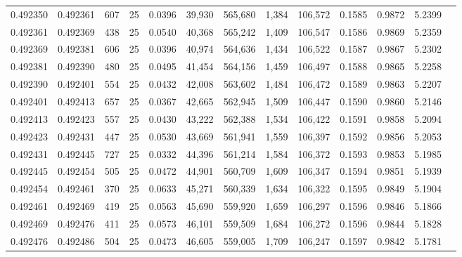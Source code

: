 \begin{tabular}{rrrrrrrrrrrrr}
0.492350 & 0.492361 &   607 &  25 &                                     0.0396 &  39,930 & 565,680 &   1,384 & 106,572 & 0.1585 & 0.9872 & 5.2399 \\
0.492361 & 0.492369 &   438 &  25 &                                     0.0540 &  40,368 & 565,242 &   1,409 & 106,547 & 0.1586 & 0.9869 & 5.2359 \\
0.492369 & 0.492381 &   606 &  25 &                                     0.0396 &  40,974 & 564,636 &   1,434 & 106,522 & 0.1587 & 0.9867 & 5.2302 \\
0.492381 & 0.492390 &   480 &  25 &                                     0.0495 &  41,454 & 564,156 &   1,459 & 106,497 & 0.1588 & 0.9865 & 5.2258 \\
0.492390 & 0.492401 &   554 &  25 &                                     0.0432 &  42,008 & 563,602 &   1,484 & 106,472 & 0.1589 & 0.9863 & 5.2207 \\
0.492401 & 0.492413 &   657 &  25 &                                     0.0367 &  42,665 & 562,945 &   1,509 & 106,447 & 0.1590 & 0.9860 & 5.2146 \\
0.492413 & 0.492423 &   557 &  25 &                                     0.0430 &  43,222 & 562,388 &   1,534 & 106,422 & 0.1591 & 0.9858 & 5.2094 \\
0.492423 & 0.492431 &   447 &  25 &                                     0.0530 &  43,669 & 561,941 &   1,559 & 106,397 & 0.1592 & 0.9856 & 5.2053 \\
0.492431 & 0.492445 &   727 &  25 &                                     0.0332 &  44,396 & 561,214 &   1,584 & 106,372 & 0.1593 & 0.9853 & 5.1985 \\
0.492445 & 0.492454 &   505 &  25 &                                     0.0472 &  44,901 & 560,709 &   1,609 & 106,347 & 0.1594 & 0.9851 & 5.1939 \\
0.492454 & 0.492461 &   370 &  25 &                                     0.0633 &  45,271 & 560,339 &   1,634 & 106,322 & 0.1595 & 0.9849 & 5.1904 \\
0.492461 & 0.492469 &   419 &  25 &                                     0.0563 &  45,690 & 559,920 &   1,659 & 106,297 & 0.1596 & 0.9846 & 5.1866 \\
0.492469 & 0.492476 &   411 &  25 &                                     0.0573 &  46,101 & 559,509 &   1,684 & 106,272 & 0.1596 & 0.9844 & 5.1828 \\
0.492476 & 0.492486 &   504 &  25 &                                     0.0473 &  46,605 & 559,005 &   1,709 & 106,247 & 0.1597 & 0.9842 & 5.1781 \\

\end{tabular}

